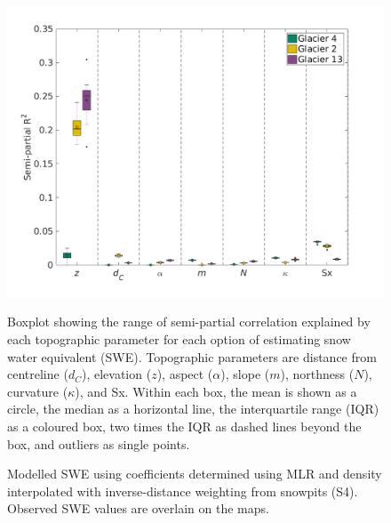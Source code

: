 \documentclass{sfuthesis}
\newcommand{\params}{Topographic parameters are distance from centreline ($d_C$), elevation ($z$), aspect ($\alpha$), slope ($m$), northness ($N$), curvature ($\kappa$), and Sx. }
\newcommand{\boxplot}{Within each box, the mean is shown as a circle, the median as a horizontal line, the interquartile range (IQR) as a coloured box, two times the IQR as dashed lines beyond the box, and outliers as single points. }
\newcommand{\swedots}{Observed SWE values are overlain on the maps. }
\begin{document}
\begin{figure}[H]
	\centering
	\includegraphics[width =1.1 \textwidth]{MLRsemiR2_DensityOpts.png}\\
	\caption{Boxplot showing the range of semi-partial correlation explained by each topographic parameter for each option of estimating snow water equivalent (SWE). \params \boxplot }
	\label{fig:MLRsemiR2_densityOptions}
\end{figure} 

\begin{figure}[H]
	\caption{Modelled SWE using coefficients determined using MLR and density interpolated with inverse-distance weighting from snowpits (S4). \swedots}
	\label{fig:MLRmodelledSWE}
\end{figure}
\end{document}
